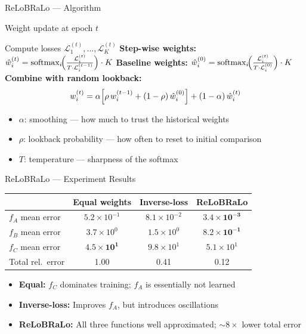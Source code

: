 \documentclass[aspectratio=169,11pt]{beamer}
\newcommand{\emphc}[1]{\textcolor{harvardcrimson}{#1}}
\begin{document}
\begin{frame}{ReLoBRaLo --- Algorithm}
\begin{block}{Weight update at epoch $t$}
\begin{algorithmic}[1]
\STATE Compute losses $\mathcal{L}_1^{(t)}, \ldots, \mathcal{L}_K^{(t)}$
\STATE \textbf{Step-wise weights:}\; $\hat{w}_i^{(t)} = \operatorname{softmax}_i\!\Bigl(\frac{\mathcal{L}_i^{(t)}}{T \cdot \mathcal{L}_i^{(t-1)}}\Bigr) \cdot K$
\STATE \textbf{Baseline weights:}\; $\hat{w}_i^{(0)} = \operatorname{softmax}_i\!\Bigl(\frac{\mathcal{L}_i^{(t)}}{T \cdot \mathcal{L}_i^{(0)}}\Bigr) \cdot K$
\STATE \textbf{Combine with random lookback:}
\[
    w_i^{(t)} = \alpha \Bigl[\rho \, w_i^{(t-1)} + (1-\rho) \, \hat{w}_i^{(0)}\Bigr] + (1-\alpha) \, \hat{w}_i^{(t)}
\]
\end{algorithmic}
\end{block}

\vspace{0.3cm}
\begin{itemize}
    \item $\alpha$: smoothing --- how much to trust the historical weights
    \item $\rho$: lookback probability --- how often to reset to initial comparison
    \item $T$: temperature --- sharpness of the softmax
\end{itemize}
\end{frame}

\begin{frame}{ReLoBRaLo --- Experiment Results}
\begin{center}
\renewcommand{\arraystretch}{1.3}
{\small
\begin{tabular}{@{}lccc@{}}
\toprule
 & \textbf{Equal weights} & \textbf{Inverse-loss} & \textbf{ReLoBRaLo} \\
\midrule
$f_A$ mean error & $5.2 \times 10^{-1}$ & $8.1 \times 10^{-2}$ & $\bm{3.4 \times 10^{-3}}$ \\
$f_B$ mean error & $3.7 \times 10^{0}$ & $1.5 \times 10^{0}$ & $\bm{8.2 \times 10^{-1}}$ \\
$f_C$ mean error & $\bm{4.5 \times 10^{1}}$ & $9.8 \times 10^{1}$ & $5.1 \times 10^{1}$ \\
\midrule
Total rel.\ error & 1.00 & 0.41 & \emphc{0.12} \\
\bottomrule
\end{tabular}
}
\end{center}

\vspace{0.3cm}
\begin{itemize}
    \item \textbf{Equal:} $f_C$ dominates training; $f_A$ is essentially \emphc{not learned}
    \item \textbf{Inverse-loss:} Improves $f_A$, but introduces oscillations
    \item \textbf{ReLoBRaLo:} All three functions well approximated; $\sim 8\times$ lower total error
\end{itemize}
\end{frame}
\end{document}
